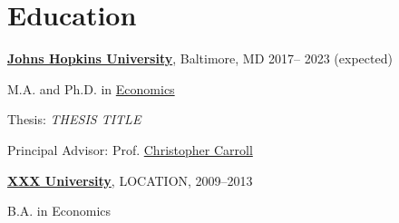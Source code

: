 
\section{Education}
\href{https://www.jhu.edu}{\textbf{Johns Hopkins University}}, Baltimore, MD \hfill 2017-- 2023 (expected)
\begin{outerlist}
	\item M.A. and Ph.D.  in \href{https://econ.jhu.edu} {Economics}
	 \item Thesis: \textit{THESIS TITLE}
	  {\item Principal Advisor: Prof. \href{https://econ.jhu.edu/directory/christopher-carroll/}{Christopher Carroll} 
	}
\end{outerlist}


\vspace{0.1in}
\href{https://www.xxxx.com}{\textbf{XXX University}}, LOCATION, \hfill 2009--2013
\begin{outerlist}
	\item B.A. in Economics 
\end{outerlist}
